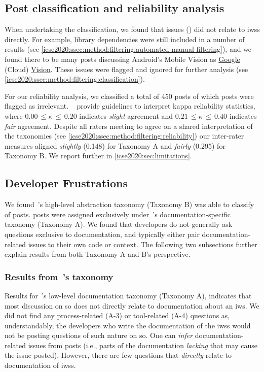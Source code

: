 \subsection{Post classification and reliability analysis}
%
When undertaking the classification, we found that \NumPostsNoise{} issues (\PctPostsNoise{}) did not relate to \glspl{iws} directly. For example, library dependencies were still included in a number of results (see \cref{icse2020:ssec:method:filtering:automated-manual-filtering}), and we found there to be many posts  discussing Android's Mobile Vision  as \uline{Google} (Cloud) \uline{Vision}. These issues were flagged and ignored for further analysis (see \cref{icse2020:ssec:method:filtering:classification}).
%

For our reliability analysis, we classified a total of 450 posts of which \NumPostsFromFiftyNoise{} posts were flagged as irrelevant.
%
~\citet{Landis:1977kv} provide guidelines to interpret kappa reliability statistics, where $0.00\,\leq \kappa\,\leq\,0.20$ indicates \textit{slight} agreement and $0.21\,\leq \kappa\,\leq\,0.40$ indicates \textit{fair} agreement.
Despite all raters meeting to agree on a shared interpretation of the taxonomies (see \cref{icse2020:ssec:method:filtering:reliability}) our inter-rater measures aligned \textit{slightly} (0.148) for Taxonomy A and \textit{fairly} (0.295) for Taxonomy B. We report further in \cref{icse2020:sec:limitations}.

\subsection{Developer Frustrations}

We found~\citeauthor{Beyer:2018fm}'s high-level abstraction taxonomy (Taxonomy B) was able to classify \PctTaxBCategorised{} of posts.  \PctTaxACategorised{} posts were assigned exclusively under~\citeauthor{Aghajani:2019bo}'s documentation-specific taxonomy (Taxonomy A).
We found that developers do not generally ask questions exclusive to documentation, and typically either pair documentation-related issues to their own code or context. The following two subsections further explain results from both Taxonomy A and B's perspective.

\subsubsection{Results from~\citeauthor{Aghajani:2019bo}'s taxonomy}

%
Results for~\citeauthor{Aghajani:2019bo}'s low-level documentation taxonomy (Taxonomy A), indicates that most discussion on \gls{so} does not directly relate to documentation about an \gls{iws}. We did not find any process-related (A-3) or tool-related (A-4) questions as, understandably, the developers who write the documentation of the \glspl{iws} would not be posting questions of such nature on \gls{so}.
%
One can \textit{infer} documentation-related issues from posts (i.e., parts of the documentation \textit{lacking} that may cause the issue posted). However, there are few questions that \textit{directly} relate to documentation of \glspl{iws}.

